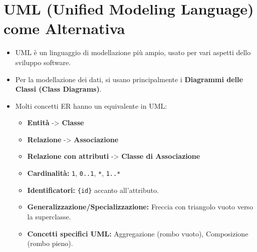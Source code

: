 \documentclass{article}
\begin{document}
	\section{UML (Unified Modeling Language) come Alternativa}
	\begin{itemize}
		\item UML è un linguaggio di modellazione più ampio, usato per vari aspetti dello sviluppo software.
		\item Per la modellazione dei dati, si usano principalmente i \textbf{Diagrammi delle Classi (Class Diagrams)}.
		\item Molti concetti ER hanno un equivalente in UML:
		\begin{itemize}
			\item \textbf{Entità} -> \textbf{Classe}
			\item \textbf{Relazione} -> \textbf{Associazione}
			\item \textbf{Relazione con attributi} -> \textbf{Classe di Associazione}
			\item \textbf{Cardinalità:} \texttt{1}, \texttt{0..1}, \texttt{*}, \texttt{1..*}
			\item \textbf{Identificatori:} \texttt{\{id\}} accanto all'attributo.
			\item \textbf{Generalizzazione/Specializzazione:} Freccia con triangolo vuoto verso la superclasse.
			\item \textbf{Concetti specifici UML:} Aggregazione (rombo vuoto), Composizione (rombo pieno).
		\end{itemize}
	\end{itemize}
	
\end{document}
